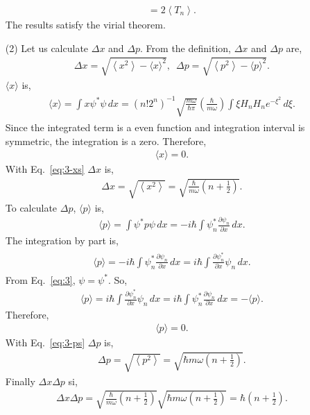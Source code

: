 \documentclass[floatfix,nofootinbib,superscriptaddress,fleqn]{revtex4-2}
\begin{document}
\begin{itemize}
\begin{align}
  =2\left\langle T_n\right\rangle.
  \end{align}
  The results satisfy the virial theorem.
  \item[(2)] Let us calculate $\Delta x$ and $\Delta p$. 
  From the definition, $\Delta x$ and $\Delta p$ are,
  \begin{align}
      \Delta x = \sqrt{\left\langle x^2\right\rangle - {\langle x\rangle}^2  },\,\,\,
      \Delta p = \sqrt{\left\langle p^2\right\rangle - {\langle p\rangle}^2  }.
  \end{align}
  $\langle x\rangle$ is,
  \begin{align}
    \begin{split}
      \langle x\rangle = \int x\psi^*\psi\,dx 
      = (n!2^n)^{-1}\sqrt{\frac{m\omega}{\hbar\pi}}\left(\frac{\hbar}{m\omega}\right)
      \int \xi H_nH_n e^{-\xi^2}\,d\xi.
    \end{split}
  \end{align}
  Since the integrated term is a even function and integration interval is symmetric,
  the integration is a zero. Therefore,
  \begin{align}
    \langle x\rangle = 0.
  \end{align}
  With Eq.~\eqref{eq:3-xs} $\Delta x$ is,
  \begin{align}
    \Delta x = \sqrt{\left\langle x^2\right\rangle}
    = \sqrt{\frac{\hbar}{m\omega}
    \left( n+\frac{1}{2}\right)}.
  \end{align}
  To calculate $\Delta p$,
  $\langle p\rangle$ is,
  \begin{align}
    \langle p\rangle = \int \psi^*p\psi\,dx
    = -i\hbar\int\psi^*_n
    \frac{\partial \psi_n}{\partial x} \,dx.
  \end{align}
  The integration by part is,
  \begin{align}
    \begin{split}
      \langle p\rangle=-i\hbar\int\psi^*_n
      \frac{\partial \psi_n}{\partial x} \,dx
      =i\hbar\int\frac{\partial \psi^*_n}{\partial x}
      \psi_n \,dx.
    \end{split}
  \end{align}
  From Eq.~\eqref{eq:3}, $\psi = \psi^*$. So,
  \begin{align}
    \langle p\rangle=i\hbar\int\frac{\partial \psi^*_n}{\partial x}
    \psi_n \,dx=i\hbar\int\psi^*_n
    \frac{\partial \psi_n}{\partial x}\,dx = -\langle p\rangle.
  \end{align}
  Therefore,
  \begin{align}
    \langle p\rangle = 0.
  \end{align}
  With Eq.~\eqref{eq:3-ps} $\Delta p$ is,
  \begin{align}
    \Delta p = \sqrt{\left\langle p^2\right\rangle}
    = \sqrt{\hbar m\omega\left( n+\frac{1}{2} \right)}.
  \end{align}
  Finally $\Delta x\Delta p$ si,
  \begin{align}
    \Delta x\Delta p = \sqrt{\frac{\hbar}{m\omega}
    \left(n+\frac{1}{2}\right)}\sqrt{\hbar m\omega
    \left(n+\frac{1}{2}\right)}
    =\hbar\left(n+\frac{1}{2}\right).
  \end{align}
\end{itemize}
\end{document}
